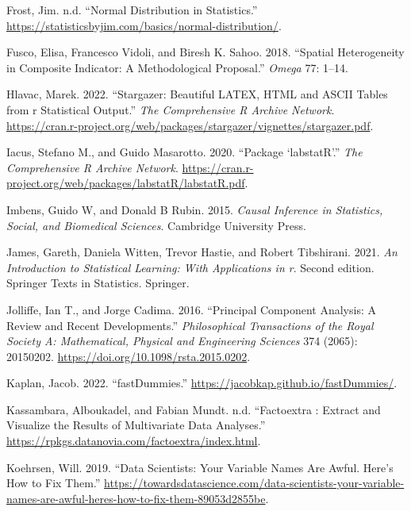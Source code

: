 \documentclass[
]{svmono}
\newlength{\cslhangindent}
\newlength{\cslentryspacingunit} %
\newenvironment{CSLReferences}[2] %
 {%
  \setlength{\parindent}{0pt}
  \ifodd #1
  \let\oldpar\par
  \def\par{\hangindent=\cslhangindent\oldpar}
  \fi
  \setlength{\parskip}{#2\cslentryspacingunit}
 }%
 {}
\begin{document}
\begin{CSLReferences}{1}{0}
\leavevmode{}%
Frost, Jim. n.d. {``Normal Distribution in Statistics.''} \url{https://statisticsbyjim.com/basics/normal-distribution/}.

\leavevmode{}%
Fusco, Elisa, Francesco Vidoli, and Biresh K. Sahoo. 2018. {``Spatial Heterogeneity in Composite Indicator: A Methodological Proposal.''} \emph{Omega} 77: 1--14.

\leavevmode{}%
Hlavac, Marek. 2022. {``Stargazer: Beautiful LATEX, HTML and ASCII Tables from r Statistical Output.''} \emph{The Comprehensive R Archive Network}. \url{https://cran.r-project.org/web/packages/stargazer/vignettes/stargazer.pdf}.

\leavevmode{}%
Iacus, Stefano M., and Guido Masarotto. 2020. {``Package {`labstatR'}.''} \emph{The Comprehensive R Archive Network}. \url{https://cran.r-project.org/web/packages/labstatR/labstatR.pdf}.

\leavevmode{}%
Imbens, Guido W, and Donald B Rubin. 2015. \emph{Causal Inference in Statistics, Social, and Biomedical Sciences}. Cambridge University Press.

\leavevmode{}%
James, Gareth, Daniela Witten, Trevor Hastie, and Robert Tibshirani. 2021. \emph{An Introduction to Statistical Learning: With Applications in r}. Second edition. Springer Texts in Statistics. Springer.

\leavevmode{}%
Jolliffe, Ian T., and Jorge Cadima. 2016. {``Principal Component Analysis: A Review and Recent Developments.''} \emph{Philosophical Transactions of the Royal Society A: Mathematical, Physical and Engineering Sciences} 374 (2065): 20150202. \url{https://doi.org/10.1098/rsta.2015.0202}.

\leavevmode{}%
Kaplan, Jacob. 2022. {``fastDummies.''} \url{https://jacobkap.github.io/fastDummies/}.

\leavevmode{}%
Kassambara, Alboukadel, and Fabian Mundt. n.d. {``Factoextra : Extract and Visualize the Results of Multivariate Data Analyses.''} \url{https://rpkgs.datanovia.com/factoextra/index.html}.

\leavevmode{}%
Koehrsen, Will. 2019. {``Data Scientists: Your Variable Names Are Awful. Here's How to Fix Them.''} \url{https://towardsdatascience.com/data-scientists-your-variable-names-are-awful-heres-how-to-fix-them-89053d2855be}.


\end{CSLReferences}
\end{document}
